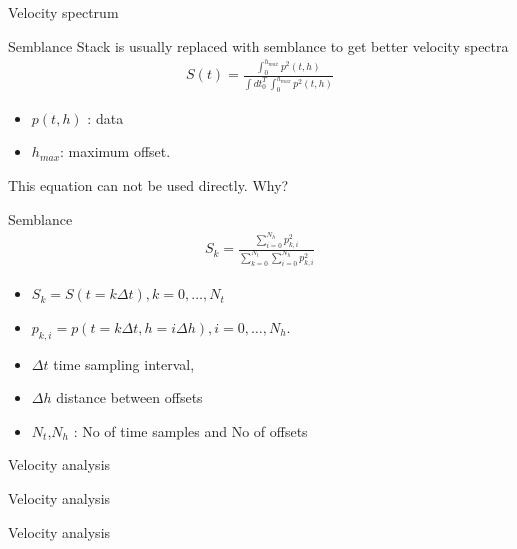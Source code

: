 \documentclass[xcolor=dvipsnames,notes]{beamer}
\begin{document}
\begin{frame}{Velocity spectrum}
\end{frame}
\begin{frame}{Semblance}
Stack is usually replaced with semblance to
get better velocity spectra  
\begin{eqnarray}
S(t) = \frac{\int_0^{h_{max}} p^2(t,h)}{\int dt_0^T\, \int_0^{h_{max}} p^2(t,h)}
\end{eqnarray}
\begin{itemize}
 \item $p(t,h)$ : data 
 \item $h_{max}$: maximum offset. 
\end{itemize}
This equation can not be used directly.  Why?
\end{frame}
%
\begin{frame}{Semblance}
\begin{eqnarray}
S_k = \frac{\sum_{i=0}^{N_h} p^2_{k,i}}{\sum_{k=0}^{N_t} \sum_{i=0}^{N_h} p^2_{k,i}}
\end{eqnarray}
\begin{itemize}
 \item $S_k = S(t=k\Delta t), k=0,\ldots,N_t$ 
 \item $p_{k,i}=p(t=k\Delta t,h=i\Delta h), i=0,\ldots,N_h$. 
 \item $\Delta t$ time sampling interval, 
 \item $\Delta h$ distance between offsets \item $N_t$,$N_h$ :
No of time samples and No of  offsets
\end{itemize}
\end{frame}
\begin{frame}{Velocity analysis}
\end{frame}
\begin{frame}{Velocity analysis}
\end{frame}
\begin{frame}{Velocity analysis}
\end{frame}
\end{document}
